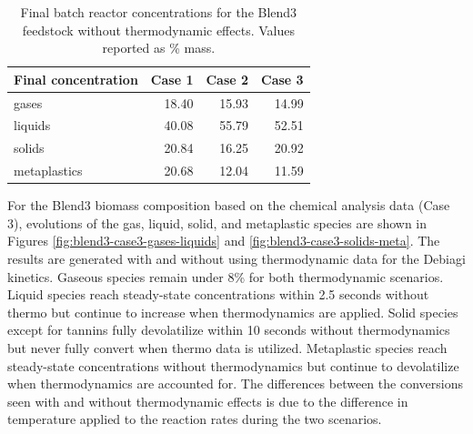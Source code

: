 \begin{table}[H]
    \centering
    \caption{Final batch reactor concentrations for the Blend3 feedstock without thermodynamic effects. Values reported as \% mass.}
    \label{tab:blend3-batch-final}
    \begin{tabular}{lrrr}
        \toprule
        Final concentration & Case 1 & Case 2 & Case 3 \\
        \midrule
        gases         & 18.40 & 15.93 & 14.99 \\
        liquids       & 40.08 & 55.79 & 52.51 \\
        solids        & 20.84 & 16.25 & 20.92 \\
        metaplastics  & 20.68 & 12.04 & 11.59 \\
        \bottomrule
    \end{tabular}
\end{table}

For the Blend3 biomass composition based on the chemical analysis data (Case 3), evolutions of the gas, liquid, solid, and metaplastic species are shown in Figures \ref{fig:blend3-case3-gases-liquids} and \ref{fig:blend3-case3-solids-meta}. The results are generated with and without using thermodynamic data for the Debiagi kinetics. Gaseous species remain under 8\% for both thermodynamic scenarios. Liquid species reach steady-state concentrations within 2.5 seconds without thermo but continue to increase when thermodynamics are applied. Solid species except for tannins fully devolatilize within 10 seconds without thermodynamics but never fully convert when thermo data is utilized. Metaplastic species reach steady-state concentrations without thermodynamics but continue to devolatilize when thermodynamics are accounted for. The differences between the conversions seen with and without thermodynamic effects is due to the difference in temperature applied to the reaction rates during the two scenarios.

